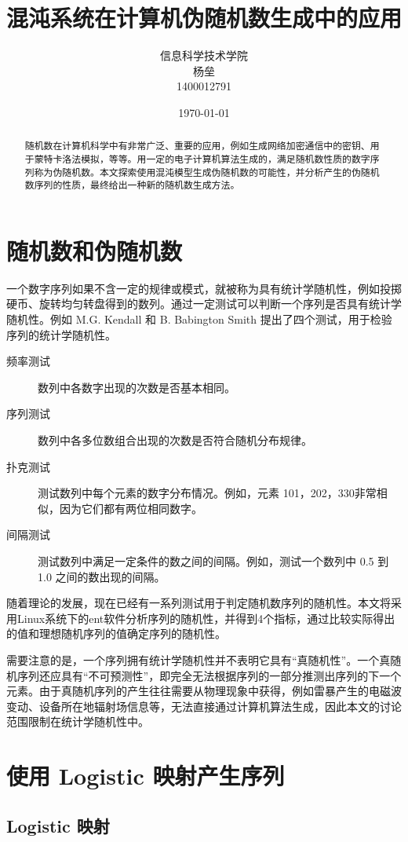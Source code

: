 \documentclass[UTF8]{ctexart}
\title{混沌系统在计算机伪随机数生成中的应用}
\author{信息科学技术学院\\
杨垒\\
1400012791}
\date{\today}
\begin{document}
\maketitle
\begin{abstract}
随机数在计算机科学中有非常广泛、重要的应用，例如生成网络加密通信中的密钥、用于蒙特卡洛法模拟，等等。用一定的电子计算机算法生成的，满足随机数性质的数字序列称为伪随机数。本文探索使用混沌模型生成伪随机数的可能性，并分析产生的伪随机数序列的性质，最终给出一种新的随机数生成方法。
\end{abstract}

\section{随机数和伪随机数}
一个数字序列如果不含一定的规律或模式，就被称为具有统计学随机性，例如投掷硬币、旋转均匀转盘得到的数列。通过一定测试可以判断一个序列是否具有统计学随机性。例如 M.G. Kendall 和 B. Babington Smith 提出了四个测试\cite{randomnesstest}，用于检验序列的统计学随机性。

\begin{description}
  \item[频率测试] 数列中各数字出现的次数是否基本相同。
  \item[序列测试] 数列中各多位数组合出现的次数是否符合随机分布规律。
  \item[扑克测试] 测试数列中每个元素的数字分布情况。例如，元素 101，202，330非常相似，因为它们都有两位相同数字。
  \item[间隔测试] 测试数列中满足一定条件的数之间的间隔。例如，测试一个数列中 0.5 到 1.0 之间的数出现的间隔。
\end{description}

随着理论的发展，现在已经有一系列测试用于判定随机数序列的随机性。本文将采用Linux系统下的ent软件\cite{enttestprogram}分析序列的随机性，并得到4个指标，通过比较实际得出的值和理想随机序列的值确定序列的随机性。

需要注意的是，一个序列拥有统计学随机性并不表明它具有“真随机性”。一个真随机序列还应具有“不可预测性”，即完全无法根据序列的一部分推测出序列的下一个元素。由于真随机序列的产生往往需要从物理现象中获得，例如雷暴产生的电磁波变动、设备所在地辐射场信息等，无法直接通过计算机算法生成，因此本文的讨论范围限制在统计学随机性中。

\section{使用 Logistic 映射产生序列}
\subsection{Logistic 映射}
\end{document}
